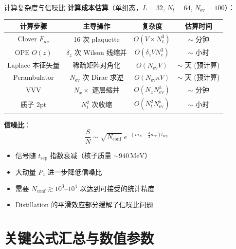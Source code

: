 \documentclass[10pt,aspectratio=169]{beamer}
\newcommand{\MeV}{\,\mathrm{MeV}}
\begin{document}
\begin{frame}{计算复杂度与信噪比}
\small
\textbf{计算成本估算}（单组态，$L=32$, $N_t=64$, $N_{\text{ev}}=100$）：
\begin{center}
\begin{tabular}{c|c|c|c}
  \toprule
  \textbf{计算步骤} & \textbf{主导操作} & \textbf{复杂度} & \textbf{估算时间} \\
  \midrule
  Clover $F_{\mu\nu}$ & 16 次 plaquette & $O(V \times N_c^3)$ & $\sim$ 分钟 \\
  OPE $O(z)$ & $\delta_z$ 次 Wilson 线缩并 & $O(\delta_z V N_c^3)$ & $\sim$ 小时 \\
  Laplace 本征矢量 & 稀疏矩阵对角化 & $O(N_{\text{ev}} V)$ & $\sim$ 天 (预计算) \\
  Perambulator & $N_{\text{ev}}$ 次 Dirac 求逆 & $O(N_{\text{ev}} \kappa V)$ & $\sim$ 天 (预计算) \\
  VVV & $N_x \times$ 逐层缩并 & $O(N_x N_{\text{ev}}^3)$ & $\sim$ 分钟 \\
  质子 2pt & $N_t^2$ 次收缩 & $O(N_t^2 N_{\text{ev}}^5)$ & $\sim$ 小时 \\
  \bottomrule
\end{tabular}
\end{center}

\textbf{信噪比}：
\begin{equation}
  \frac{S}{N} \sim \sqrt{N_{\text{conf}}}\;
  e^{-(m_N - \frac{3}{2}m_\pi)t_{\text{sep}}}
\end{equation}

\begin{itemize}
  \item 信号随 $t_{\text{sep}}$ 指数衰减（核子质量 $\sim 940\MeV$）
  \item 大动量 $P_z$ 进一步降低信噪比
  \item 需要 $N_{\text{conf}} \gtrsim 10^3$--$10^4$ 以达到可接受的统计精度
  \item Distillation 的平滑效应部分缓解了信噪比问题
\end{itemize}
\end{frame}

\section{关键公式汇总与数值参数}
\end{document}
